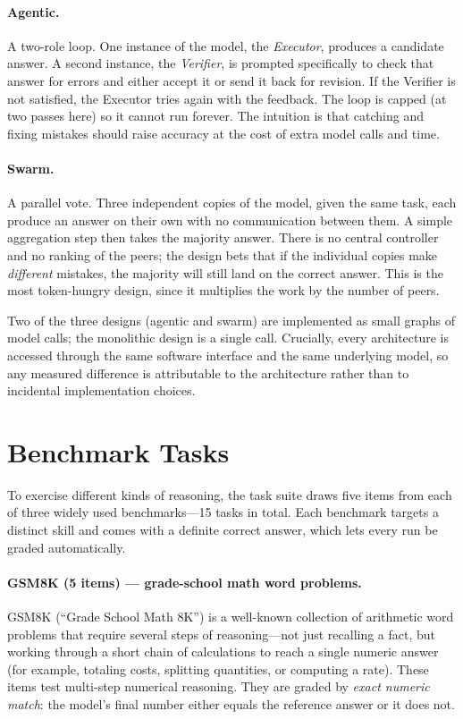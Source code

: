\documentclass[sigconf,nonacm]{acmart}
\begin{document}
\paragraph{Agentic.} A two-role loop. One instance of the model, the
\emph{Executor}, produces a candidate answer. A second instance, the
\emph{Verifier}, is prompted specifically to check that answer for errors and
either accept it or send it back for revision. If the Verifier is not satisfied,
the Executor tries again with the feedback. The loop is capped (at two passes
here) so it cannot run forever. The intuition is that catching and fixing
mistakes should raise accuracy at the cost of extra model calls and time.

\paragraph{Swarm.} A parallel vote. Three independent copies of the model, given
the same task, each produce an answer on their own with no communication between
them. A simple aggregation step then takes the majority answer. There is no
central controller and no ranking of the peers; the design bets that if the
individual copies make \emph{different} mistakes, the majority will still land on
the correct answer. This is the most token-hungry design, since it multiplies the
work by the number of peers.

Two of the three designs (agentic and swarm) are implemented as small graphs of
model calls; the monolithic design is a single call. Crucially, every
architecture is accessed through the same software interface and the same
underlying model, so any measured difference is attributable to the architecture
rather than to incidental implementation choices.

\section{Benchmark Tasks}
\label{sec:tasks}

To exercise different kinds of reasoning, the task suite draws five items from
each of three widely used benchmarks---15 tasks in total. Each benchmark targets a
distinct skill and comes with a definite correct answer, which lets every run be
graded automatically.

\paragraph{GSM8K (5 items) --- grade-school math word problems.} GSM8K
(``Grade School Math 8K'') is a well-known collection of arithmetic word problems
that require several steps of reasoning---not just recalling a fact, but working
through a short chain of calculations to reach a single numeric answer (for
example, totaling costs, splitting quantities, or computing a rate). These items
test multi-step numerical reasoning. They are graded by \emph{exact numeric
match}: the model's final number either equals the reference answer or it does
not.
\end{document}
